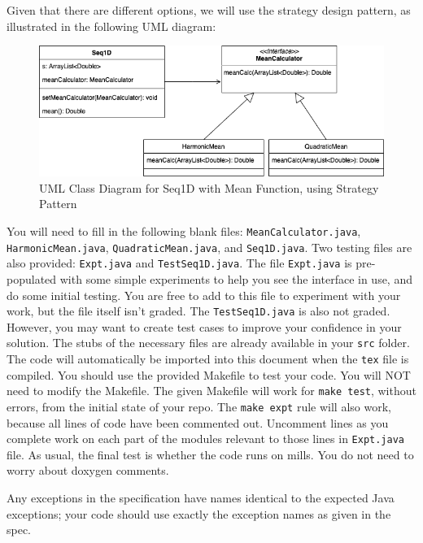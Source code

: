 \documentclass[12pt,fleqn]{examtst}
\begin{document}
Given that there are different options, we will use the strategy design pattern,
as illustrated in the following UML diagram:

\begin{figure}[!h]
\begin{center}
\includegraphics[scale=0.7]{Seq1D_Mean_Strategy_UML.png}
\end{center}
\caption{UML Class Diagram for Seq1D with Mean Function, using Strategy
  Pattern} \label{Fig_UML_Strategy}
\end{figure}

You will need to fill in the following blank files:
\texttt{MeanCalculator.java}, \texttt{HarmonicMean.java},
\texttt{QuadraticMean.java}, and \texttt{Seq1D.java}.  Two testing files are
also provided: \texttt{Expt.java} and \texttt{TestSeq1D.java}.  The file
\texttt{Expt.java} is pre-populated with some simple experiments to help you see
the interface in use, and do some initial testing.  You are free to add to this
file to experiment with your work, but the file itself isn't graded.  The
\texttt{TestSeq1D.java} is also not graded.  However, you may want to create
test cases to improve your confidence in your solution.  The stubs of the
necessary files are already available in your \texttt{src} folder.  The code
will automatically be imported into this document when the \texttt{tex} file is
compiled.  You should use the provided Makefile to test your code.  You will NOT
need to modify the Makefile.  The given Makefile will work for \texttt{make
  test}, without errors, from the initial state of your repo.  The \texttt{make
  expt} rule will also work, because all lines of code have been commented out.
Uncomment lines as you complete work on each part of the modules relevant to
those lines in \texttt{Expt.java} file.  As usual, the final test is whether the
code runs on mills.  You do not need to worry about doxygen comments.

Any exceptions in the specification have names identical to the expected Java
exceptions; your code should use exactly the exception names as given in the
spec.
\end{document}
